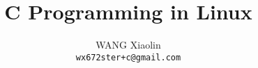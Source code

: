 \usepackage{wx672tut}



\newcommand{\textbooks}{\nocite{stevens2013advanced, raymond2003art, matthew2008beginning,
    kernighan2006c, king2008c, reek1997pointers, weiss1993data, waite1987c}}%



\title{C Programming in Linux}
\author{WANG Xiaolin\\%
  {\footnotesize\texttt{wx672ster+c@gmail.com}}}


